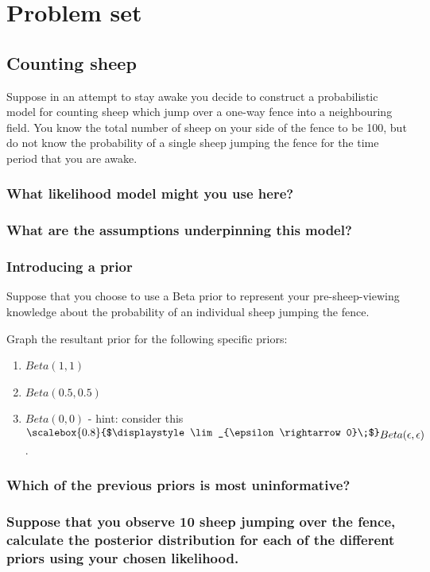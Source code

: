 \documentclass[11pt,fullpage]{book}
\newcommand{\Lim}[1]{\raisebox{0.5ex}{\scalebox{0.8}{$\displaystyle \lim_{#1}\;$}}}
\begin{document}
\section{Problem set}
\subsection{Counting sheep}
Suppose in an attempt to stay awake you decide to construct a probabilistic model for counting sheep which jump over a one-way fence into a neighbouring field. You know the total number of sheep on your side of the fence to be 100, but do not know the probability of a single sheep jumping the fence for the time period that you are awake.

\subsubsection{What likelihood model might you use here?}
\subsubsection{What are the assumptions underpinning this model?}

\subsubsection{Introducing a prior}
Suppose that you choose to use a Beta prior to represent your pre-sheep-viewing knowledge about the probability of an individual sheep jumping the fence. 

Graph the resultant prior for the following specific priors:

\begin{enumerate}
\item $Beta(1,1)$
\item $Beta(0.5,0.5)$
\item $Beta(0,0)$ - hint: consider this $\Lim{\epsilon \rightarrow 0} Beta(\epsilon,\epsilon)$.
\end{enumerate}

\subsubsection{Which of the previous priors is most uninformative?}
\subsubsection{Suppose that you observe 10 sheep jumping over the fence, calculate the posterior distribution for each of the different priors using your chosen likelihood.}
\end{document}
